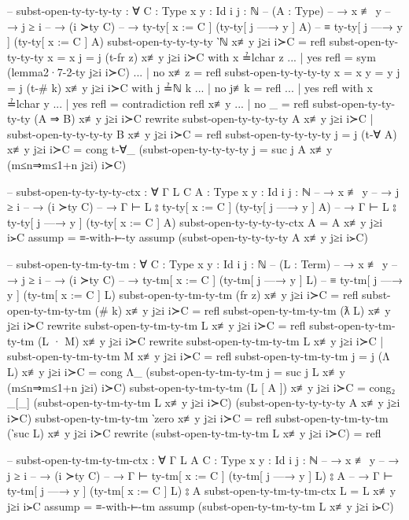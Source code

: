 \documentclass[logo,bsc,singlespacing,parskip,online]{infthesis}
\begin{document}
\begin{code}
  -- subst-open-ty-ty-ty-ty : ∀ {C : Type} {x y : Id} {i j : ℕ}
  --   (A : Type)
  --   → x ≢ y
  --   → j ≥ i
  --   → (i ≻ty C)
  --   → ty-ty[ x := C ] (ty-ty[ j —→ y ] A)
  --     ≡ ty-ty[ j —→ y ] (ty-ty[ x := C ] A)
  subst-open-ty-ty-ty-ty ‵ℕ x≢y j≥i i≻C = refl
  subst-open-ty-ty-ty-ty {x = x} {j = j} (t-fr z) x≢y j≥i i≻C with x ≟lchar z
  ... | yes refl = sym (lemma2·7-2-ty j≥i i≻C)
  ... | no  x≢z  = refl
  subst-open-ty-ty-ty-ty {x = x} {y = y} {j = j} (t-# k) x≢y j≥i i≻C with j ≟ℕ k
  ... | no  j≢k  = refl
  ... | yes refl with x ≟lchar y
  ...   | yes refl = contradiction refl x≢y
  ...   | no  _    = refl
  subst-open-ty-ty-ty-ty (A ⇒ B) x≢y j≥i i≻C rewrite
      subst-open-ty-ty-ty-ty A x≢y j≥i i≻C
    | subst-open-ty-ty-ty-ty B x≢y j≥i i≻C
    = refl
  subst-open-ty-ty-ty-ty {j = j} (t-∀ A) x≢y j≥i i≻C = cong t-∀_
    (subst-open-ty-ty-ty-ty {j = suc j} A x≢y (m≤n⇒m≤1+n j≥i) i≻C)

  -- subst-open-ty-ty-ty-ty-ctx : ∀ {Γ L} {C A : Type} {x y : Id} {i j : ℕ}
  --   → x ≢ y
  --   → j ≥ i
  --   → (i ≻ty C)
  --   → Γ ⊢ L ⦂ ty-ty[ x := C ] (ty-ty[ j —→ y ] A)
  --   → Γ ⊢ L ⦂ ty-ty[ j —→ y ] (ty-ty[ x := C ] A)
  subst-open-ty-ty-ty-ty-ctx {A = A} x≢y j≥i i≻C assump = ≡-with-⊢-ty assump (subst-open-ty-ty-ty-ty A x≢y j≥i i≻C)

  -- subst-open-ty-tm-ty-tm : ∀ {C : Type} {x y : Id} {i j : ℕ}
  --   (L : Term)
  --   → x ≢ y
  --   → j ≥ i
  --   → (i ≻ty C)
  --   → ty-tm[ x := C ] (ty-tm[ j —→ y ] L)
  --     ≡ ty-tm[ j —→ y ] (ty-tm[ x := C ] L)
  subst-open-ty-tm-ty-tm (fr z) x≢y j≥i i≻C = refl
  subst-open-ty-tm-ty-tm (# k) x≢y j≥i i≻C = refl
  subst-open-ty-tm-ty-tm (ƛ L) x≢y j≥i i≻C rewrite
    subst-open-ty-tm-ty-tm L x≢y j≥i i≻C = refl
  subst-open-ty-tm-ty-tm (L · M) x≢y j≥i i≻C rewrite
      subst-open-ty-tm-ty-tm L x≢y j≥i i≻C
    | subst-open-ty-tm-ty-tm M x≢y j≥i i≻C
    = refl
  subst-open-ty-tm-ty-tm {j = j} (Λ L) x≢y j≥i i≻C = cong Λ_
    (subst-open-ty-tm-ty-tm {j = suc j} L x≢y (m≤n⇒m≤1+n j≥i) i≻C)
  subst-open-ty-tm-ty-tm (L [ A ]) x≢y j≥i i≻C = cong₂ _[_]
    (subst-open-ty-tm-ty-tm L x≢y j≥i i≻C)
    (subst-open-ty-ty-ty-ty A x≢y j≥i i≻C)
  subst-open-ty-tm-ty-tm ‵zero x≢y j≥i i≻C = refl
  subst-open-ty-tm-ty-tm (‵suc L) x≢y j≥i i≻C rewrite
    (subst-open-ty-tm-ty-tm L x≢y j≥i i≻C) = refl

  -- subst-open-ty-tm-ty-tm-ctx : ∀ {Γ L A} {C : Type} {x y : Id} {i j : ℕ}
  --   → x ≢ y
  --   → j ≥ i
  --   → (i ≻ty C)
  --   → Γ ⊢ ty-tm[ x := C ] (ty-tm[ j —→ y ] L) ⦂ A
  --   → Γ ⊢ ty-tm[ j —→ y ] (ty-tm[ x := C ] L) ⦂ A
  subst-open-ty-tm-ty-tm-ctx {L = L} x≢y j≥i i≻C assump = ≡-with-⊢-tm assump (subst-open-ty-tm-ty-tm L x≢y j≥i i≻C)
\end{code}
\end{document}
